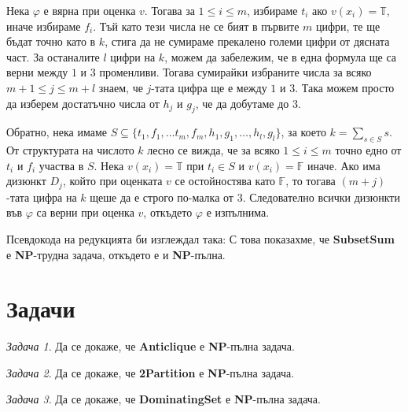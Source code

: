 \documentclass{article}
\newcommand{\T}{\mathbb{T}}
\newcommand{\F}{\mathbb{F}}
\newcommand{\NP}{\textbf{NP}}
\theoremstyle{definition}
\theoremstyle{plain}
\theoremstyle{remark}
\newtheorem{problem}{Задача}
\theoremstyle{definition}
\begin{document}
Нека $\varphi$ е вярна при оценка $v$.
Тогава за $1 \leq i \leq m$, избираме $t_i$ ако $v(x_i) = \T$, иначе избираме $f_i$.
Тъй като тези числа не се бият в първите $m$ цифри, те ще бъдат точно като в $k$, стига да не сумираме прекалено големи цифри от дясната част.
За останалите $l$ цифри на $k$, можем да забележим, че в една формула ще са верни между $1$ и $3$ променливи.
Тогава сумирайки избраните числа за всяко $m + 1 \leq j \leq m + l$ знаем, че $j$-тата цифра ще е между $1$ и $3$.
Така можем просто да изберем достатъчно числа от $h_j$ и $g_j$, че да добутаме до $3$.

Обратно, нека имаме $S \subseteq \{ t_1, f_1, \dots t_m, f_m, h_1, g_1, \dots, h_l, g_l \}$, за което $k = \sum\limits_{s \in S} s$.
От структурата на числото $k$ лесно се вижда, че за всяко $1 \leq i \leq m$ точно едно от $t_i$ и $f_i$ участва в $S$.
Нека $v(x_i) = \T$ при $t_i \in S$ и $v(x_i) = \F$ иначе.
Ако има дизюнкт $D_j$, който при оценката $v$ се остойностява като $\F$, то тогава $(m + j)$-тата цифра на $k$ щеше да е строго по-малка от $3$.
Следователно всички дизюнкти във $\varphi$ са верни при оценка $v$, откъдето $\varphi$ е изпълнима.

Псевдокода на редукцията би изглеждал така:
С това показахме, че \textbf{SubsetSum} е \NP-трудна задача, откъдето е и \NP-пълна.

\section*{Задачи}

\begin{problem}
Да се докаже, че \textbf{Anticlique} е \NP-пълна задача.
\end{problem}

\begin{problem}
Да се докаже, че \textbf{2Partition} е \NP-пълна задача.
\end{problem}

\begin{problem}
Да се докаже, че \textbf{DominatingSet} е \NP-пълна задача.
\end{problem}
\end{document}
